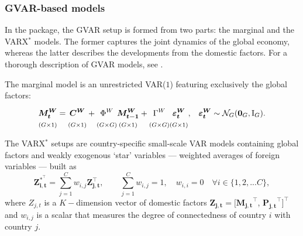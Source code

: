 \subsubsection{GVAR-based models}\label{S:GVARtheory}

In the  package, the GVAR setup is formed from two parts: the marginal and the VARX\(^{*}\) models. The former captures the joint dynamics of the global economy, whereas the latter describes the developments from the domestic factors. For a thorough description of GVAR models, see \citet{ChudikPesaran2016}.

The marginal model is an unrestricted VAR(\(1\)) featuring exclusively the global factors:
\begin{align}
& \underset{(G \times 1)}{\vphantom{\Big|}
\boldsymbol{M_t^W}}=
\underset{(G \times 1)}{\vphantom{\Big|}
\boldsymbol{C^W}} +
\underset{(G \times G)}{\vphantom{\Big|}
\Phi^W} \underset{(G \times 1)}{\vphantom{\Big|}
\boldsymbol{M_{t-1}^W}} +
\underset{(G \times G)}{\vphantom{\Big|}
\Gamma^W}\underset{(G \times 1)}{\vphantom{\Big|}
\boldsymbol{\varepsilon_{t}^W}}\text{,} & \boldsymbol{\varepsilon_t^W} \sim {\mathcal{N}_G}(\boldsymbol{0}_G,\mathrm{I}_G).
\label{eq:MarginalModel}
\end{align}

The VARX\(^{*}\) setups are country-specific small-scale VAR models containing global factors and weakly exogenous `star' variables --- weighted averages of foreign variables --- built as
\begin{equation}
 \boldsymbol{Z_{i,t}^{\ast^\top}} = \sum_{j=1}^{C} w_{i,j} \boldsymbol{Z_{j,t}^\top}, \qquad \sum_{j=1}^{C} w_{i,j}= 1, \quad w_{i,i}=0 \quad \forall i \in \{1,2, ...C \},
\label{eq:StarVar}
\end{equation}
where \(Z_{j,t}\) is a \(K-\)dimension vector of domestic factors \(\boldsymbol{Z_{j,t}} = [\boldsymbol{M_{j,t}}^\top\), \(\boldsymbol{P_{j,t}}^\top]^\top\) and \(w_{i,j}\) is a scalar that measures the degree of connectedness of country \(i\) with country \(j\).

